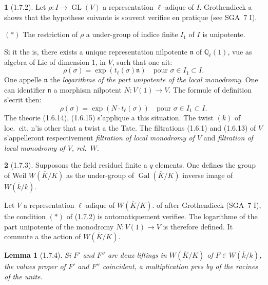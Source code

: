 \documentclass[12pt,a4paper]{article}
\theoremstyle{plain}
\newtheorem{lemma}[theorem]{Lemma}
\theoremstyle{definition}
\theoremstyle{definition}
\newtheorem{para}{}[section]
\theoremstyle{remark}
\DeclareMathOperator{\Gal}{Gal}
\DeclareMathOperator{\GL}{GL}
\begin{document}
\begin{para}[1.7.2]
Let $\rho: I \to \GL(V)$ a representation $\ell$-adique of $I$. Grothendieck a shows that the hypothese suivante is souvent verifiee en pratique (see SGA~7 I).

$(*)$ The restriction of $\rho$ a under-group of indice finite $I_1$ of $I$ is unipotente.

Si it the is, there exists a unique representation nilpotente $\mathfrak{n}$ of $\mathbb{Q}_\ell(1)$, vue as algebra of Lie of dimension $1$, in $V$, such that one ait:
\begin{equation}\tag{1.7.2.1}
\rho(\sigma) = \exp(t_\ell(\sigma) \mathfrak{n}) \quad \text{pour } \sigma \in I_1 \subset I.
\end{equation}
One appelle $\mathfrak{n}$ the \emph{logarithme of the part unipotente of the local monodromy}. One can identifier $\mathfrak{n}$ a morphism nilpotent $N: V(1) \to V$.
The formule of definition s'ecrit then:
\begin{equation}\tag{1.7.2.2}
\rho(\sigma) = \exp(N \cdot t_\ell(\sigma)) \quad \text{pour } \sigma \in I_1 \subset I.
\end{equation}
The theorie (1.6.14), (1.6.15) s'applique a this situation. The twist $(k)$ of loc.~cit. n'is other that a twist a the Tate. The filtrations (1.6.1) and (1.6.13) of $V$ s'appelleront respectivement \emph{filtration of local monodromy of $V$} and \emph{filtration of local monodromy of $V$, rel.~$W$}.
\end{para}

\begin{para}[1.7.3]
Supposons the field residuel finite a $q$ elements. One defines the group of Weil $W(\overline{K}/K)$ as the under-group of $\Gal(\overline{K}/K)$ inverse image of $W(\overline{k}/k)$.

Let $V$ a representation $\ell$-adique of $W(\overline{K}/K)$. of after Grothendieck (SGA~7 I), the condition $(*)$ of (1.7.2) is automatiquement verifiee. The logarithme of the part unipotente of the monodromy $N: V(1) \to V$ is therefore defined. It commute a the action of $W(\overline{K}/K)$.
\end{para}

\begin{lemma}[1.7.4]
Si $F'$ and $F''$ are deux liftings in $W(\overline{K}/K)$ of $F \in W(\overline{k}/k)$, the values proper of $F'$ and $F''$ coincident, a multiplication pres by of the racines of the unite.
\end{lemma}
\end{document}
